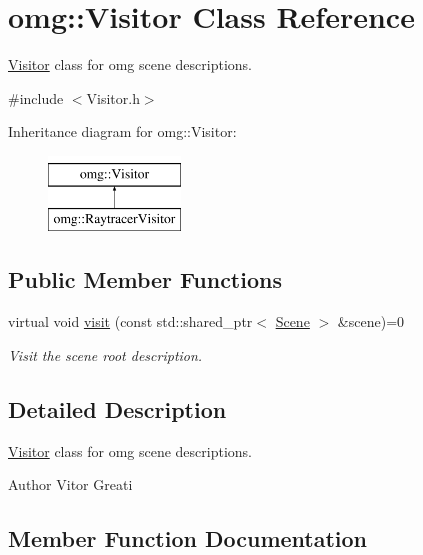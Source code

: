 \hypertarget{classomg_1_1_visitor}{}\section{omg\+::Visitor Class Reference}
\label{classomg_1_1_visitor}


\mbox{\hyperlink{classomg_1_1_visitor}{Visitor}} class for omg scene descriptions.  




{\ttfamily \#include $<$Visitor.\+h$>$}

Inheritance diagram for omg\+::Visitor\+:\begin{figure}[H]
\begin{center}
\leavevmode
\includegraphics[height=2.000000cm]{classomg_1_1_visitor}
\end{center}
\end{figure}
\subsection*{Public Member Functions}
\begin{DoxyCompactItemize}
\item 
virtual void \mbox{\hyperlink{classomg_1_1_visitor_af697e96f0f5da7c9b882ae316c81e80c}{visit}} (const std\+::shared\+\_\+ptr$<$ \mbox{\hyperlink{classomg_1_1_scene}{Scene}} $>$ \&scene)=0
\begin{DoxyCompactList}\small\item\em Visit the scene root description. \end{DoxyCompactList}\end{DoxyCompactItemize}


\subsection{Detailed Description}
\mbox{\hyperlink{classomg_1_1_visitor}{Visitor}} class for omg scene descriptions. 

\begin{DoxyAuthor}{Author}
Vitor Greati 
\end{DoxyAuthor}


\subsection{Member Function Documentation}
\mbox{\label{classomg_1_1_visitor_af697e96f0f5da7c9b882ae316c81e80c}} 
